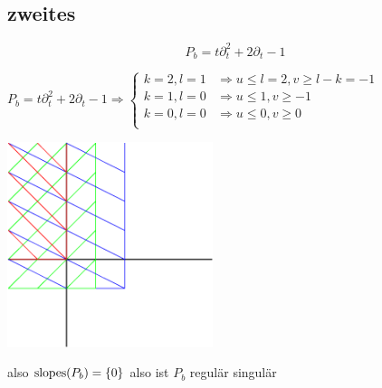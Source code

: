 \subsection{zweites}
\[
  P_b=t\partial_t^2+2\partial_t-1
\]

$
P_b=t\partial_t^2+2\partial_t-1 \Rightarrow 
\begin{cases}
  k=2,l=1 & \Rightarrow u\leq l=2, v\geq l-k=-1\\
  k=1,l=0 & \Rightarrow u\leq 1, v\geq -1\\
  k=0,l=0 & \Rightarrow u\leq 0, v\geq 0\\
\end{cases}
$

\begin{center}
  \includegraphics[width=6cm]{beispiele/img/b.png}
\end{center}
also $\operatorname{slopes}(P_b)=\{0\}$ also ist $P_b$ regulär singulär

